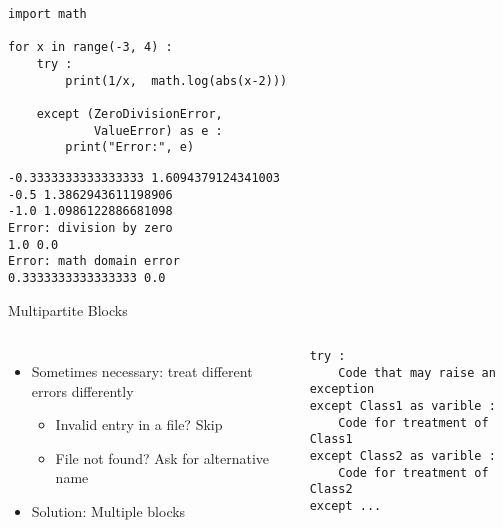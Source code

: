 
\begin{frame}[fragile]
%
\begin{tcbraster}[raster columns=2,
                  raster equal height,
                  nobeforeafter,
                  raster column skip=0.5cm]
\begin{codebox}
\begin{verbatim}
import math

for x in range(-3, 4) :
    try :
        print(1/x,  math.log(abs(x-2)))
        
    except (ZeroDivisionError,
            ValueError) as e :
        print("Error:", e)
\end{verbatim}
\end{codebox}
%
\begin{cmdbox}
\begin{verbatim}
-0.3333333333333333 1.6094379124341003
-0.5 1.3862943611198906
-1.0 1.0986122886681098
Error: division by zero
1.0 0.0
Error: math domain error
0.3333333333333333 0.0
\end{verbatim}
\end{cmdbox}
\end{tcbraster}
%
\end{frame}


\begin{frame}[fragile]{Multipartite  Blocks}
%
\begin{columns}[T]
\begin{itemize}
\item Sometimes necessary: treat different errors differently
	\begin{itemize}
	\item Invalid entry in a file? Skip
	\item File not found? Ask for alternative name
	\end{itemize}
\item Solution: Multiple  blocks
\end{itemize}
%
\begin{codebox}
\begin{verbatim}
try :
    Code that may raise an exception
except Class1 as varible :
    Code for treatment of Class1
except Class2 as varible :
    Code for treatment of Class2
except ...
\end{verbatim}
\end{codebox}
\end{columns}
%
\end{frame}

